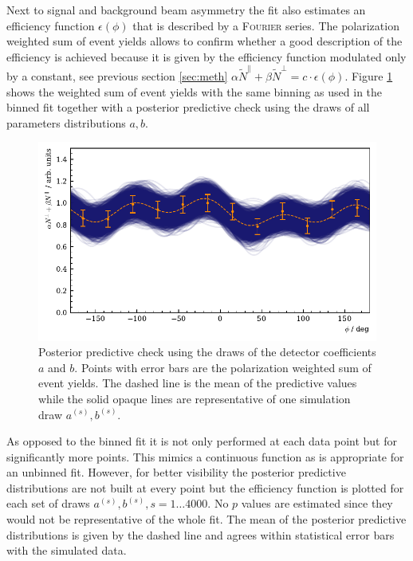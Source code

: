 Next to signal and background beam asymmetry the fit also estimates an efficiency function $\epsilon(\phi)$ that is described by a \textsc{Fourier} series. The polarization weighted sum of event yields allows to confirm whether a good description of the efficiency is achieved because it is given by the efficiency function modulated only by a constant, see previous section \ref{sec:meth} $\alpha \tilde{N}^\parallel + \beta\tilde{N}^\bot = c\cdot\epsilon\left(\phi\right).$ Figure \ref{fig:toyMC_eff_func} shows the weighted sum of event yields with the same binning as used in the binned fit together with a posterior predictive check using the draws of all parameters distributions $a,b$. 
\begin{figure}[htbp]
	\centering
	\includegraphics[width=\linewidth]{../bayes/event_based_fit/plots/toyMC_eff_PPC.pdf}
	\caption{Posterior predictive check using the draws of the detector coefficients $a$ and $b$. Points with error bars are the polarization weighted sum of event yields. The dashed line is the mean of the predictive values while the solid opaque lines are representative of one simulation draw $a^{(s)},b^{(s)}$.}
	\label{fig:toyMC_eff_func}
\end{figure}
As opposed to the binned fit it is not only performed at each data point but for significantly more points. This mimics a continuous function as is appropriate for an unbinned fit. However, for better visibility the posterior predictive distributions are not built at every point but the efficiency function is plotted for each set of draws $a^{(s)},b^{(s)}, s=1\dots4000$. No $p$ values are estimated since they would not be representative of the whole fit. The mean of the posterior predictive distributions is given by the dashed line and agrees within statistical error bars with the simulated data.
\newpage
